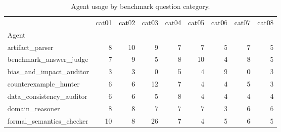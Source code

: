 \begin{table}
\caption{Agent usage by benchmark question category.}
\label{tab:agent-usage-by-category}
\begin{tabular}{lrrrrrrrr}
\toprule
 & cat01 & cat02 & cat03 & cat04 & cat05 & cat06 & cat07 & cat08 \\
Agent &  &  &  &  &  &  &  &  \\
\midrule
artifact\_parser & 8 & 10 & 9 & 7 & 7 & 5 & 7 & 5 \\
benchmark\_answer\_judge & 7 & 9 & 5 & 8 & 10 & 4 & 8 & 5 \\
bias\_and\_impact\_auditor & 3 & 3 & 0 & 5 & 4 & 9 & 0 & 3 \\
counterexample\_hunter & 6 & 6 & 12 & 7 & 4 & 4 & 5 & 3 \\
data\_consistency\_auditor & 6 & 6 & 5 & 8 & 4 & 4 & 4 & 4 \\
domain\_reasoner & 8 & 8 & 7 & 7 & 7 & 3 & 6 & 6 \\
formal\_semantics\_checker & 10 & 8 & 26 & 7 & 4 & 5 & 6 & 5 \\
\bottomrule
\end{tabular}
\end{table}

